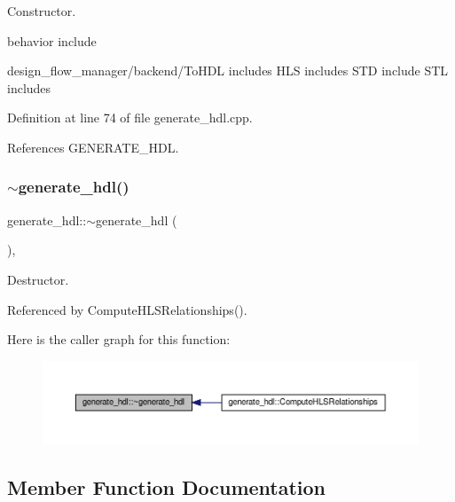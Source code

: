 Constructor. 

behavior include

design\+\_\+flow\+\_\+manager/backend/\+To\+H\+DL includes H\+LS includes S\+TD include S\+TL includes 

Definition at line 74 of file generate\+\_\+hdl.\+cpp.



References G\+E\+N\+E\+R\+A\+T\+E\+\_\+\+H\+DL.

\mbox{\label{classgenerate__hdl_a8131966dd34b98977735ed8161b6c305}} 
\subsubsection{\texorpdfstring{$\sim$generate\+\_\+hdl()}{~generate\_hdl()}}
{\footnotesize\ttfamily generate\+\_\+hdl\+::$\sim$generate\+\_\+hdl (\begin{DoxyParamCaption}{ }\end{DoxyParamCaption})\hspace{0.3cm}{\ttfamily [override]}, {\ttfamily [default]}}



Destructor. 



Referenced by Compute\+H\+L\+S\+Relationships().

Here is the caller graph for this function\+:
\nopagebreak
\begin{figure}[H]
\begin{center}
\leavevmode
\includegraphics[width=350pt]{d4/d67/classgenerate__hdl_a8131966dd34b98977735ed8161b6c305_icgraph}
\end{center}
\end{figure}


\subsection{Member Function Documentation}
\mbox{\label{classgenerate__hdl_a87b4ff40c6f91b64283253b1c1122c8f}} 

